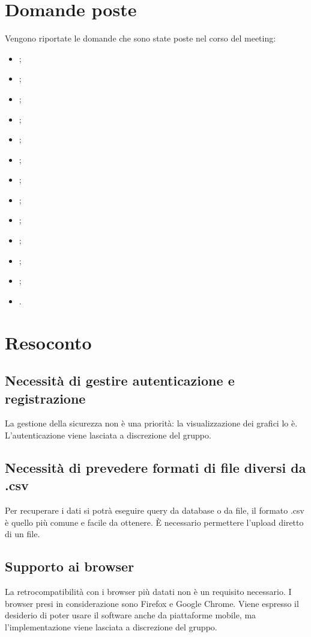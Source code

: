 \documentclass{article}
\begin{document}
\section{Domande poste}
\label{sec:domande_poste}
	Vengono riportate le domande che sono state poste nel corso del meeting:
	\begin{itemize}
		\item {};
		\item {};
		\item {};
		\item {};
		\item {};
		\item {};
		\item {};
		\item {};
		\item {};
		\item {};
		\item {};
		\item {};
        \item {}.
    	\end{itemize}

\section{Resoconto}
\label{sec:resoconto}

	\subsection{Necessità di gestire autenticazione e registrazione}
	\label{sub:domanda_01}
    La gestione della sicurezza non è una priorità: la visualizzazione dei grafici lo è. L'autenticazione viene lasciata a discrezione del gruppo.
    
    \subsection{Necessità di prevedere formati di file diversi da .csv}
	\label{sub:domanda_02}
	Per recuperare i dati si potrà eseguire query da database o da file, il formato .csv è quello più comune e facile da ottenere. È necessario permettere l'upload diretto di un file.
	
    \subsection{Supporto ai browser}
    \label{sub:domanda_03}
    La retrocompatibilità con i browser più datati non è un requisito necessario. I browser presi in considerazione sono Firefox e Google Chrome. Viene espresso il desiderio di poter usare il software anche da piattaforme mobile, ma l'implementazione viene lasciata a discrezione del gruppo.
\end{document}
